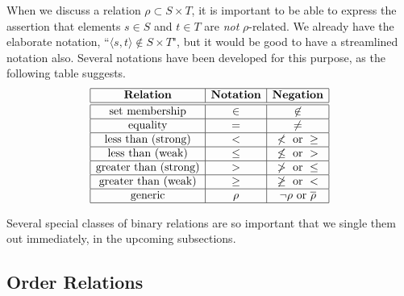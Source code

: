  
\noindent
When we discuss a relation $\rho \subset S \times T$, it is important to be able to express the assertion that elements $s \in S$ and $t \in T$ are {\em not} $\rho$-related.  We already have the elaborate notation, ``$\langle s, t \rangle \not\in S \times T$", but it would be good to have a streamlined notation also.  Several notations have been developed for this purpose, as the following table suggests.
\begin{equation}
\label{eq:NOT-rho-notation}
\begin{array}{|c|c|c|c|}
\hline
\mbox{\bf Relation} & \mbox{\bf Notation} & \mbox{\bf Negation}  \\
\hline
\hline
\mbox{set membership} & \in & \not\in  \\
\hline
\mbox{equality}       & =   & \neq     \\
\hline
\mbox{less than (strong)} & < & \not < \mbox{ or } \geq \\
\hline
\mbox{less than (weak)} & \leq & \not\leq \mbox{ or } >  \\
\hline
\mbox{greater than (strong)} & > & \not > \mbox{ or } \leq  \\
\hline
\mbox{greater than (weak)} & \geq & \not\geq \mbox{ or } <  \\
\hline
\mbox{generic}  & \rho  & \neg\rho \mbox{ or } \overline{\rho} \\
\hline
\end{array}
\end{equation}

\bigskip

Several special classes of binary relations are so important that we single them out immediately, in the upcoming subsections.


\subsection{Order Relations}
\label{sec:order-relation}

   

